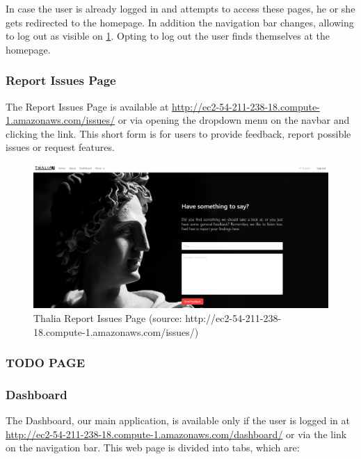 \documentclass[main.tex]{subfiles}
\begin{document}
In case the user is already logged in and attempts to access these pages, he or she gets redirected to the homepage. In addition the navigation bar changes, allowing to log out as visible on \figurename{\ref{thalia_issues}}.
Opting to log out the user finds themselves at the homepage.

\subsubsection{Report Issues Page}

The Report Issues Page is available at \url{http://ec2-54-211-238-18.compute-1.amazonaws.com/issues/} or via opening the dropdown menu on the navbar and clicking the link. This short form is for users to provide feedback, 
report possible issues or request features.

\begin{figure}[H]
   \centering
   \includegraphics[width=\textwidth]{10Appendices/081User/081Pictures/issues.png}
   \caption{Thalia Report Issues Page (source: http://ec2-54-211-238-18.compute-1.amazonaws.com/issues/)}
   \label{thalia_issues}
\end{figure}

\subsubsection{TODO PAGE}

\subsubsection{Dashboard}

The Dashboard, our main application, is available only if the user is logged in at \url{http://ec2-54-211-238-18.compute-1.amazonaws.com/dashboard/} or via the link on the navigation bar.
This web page is divided into tabs, which are:
\end{document}
